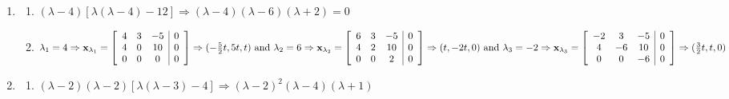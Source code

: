 \documentclass[12pt]{article}
\begin{document}
\begin{enumerate}
\begin{enumerate}
    \end{enumerate}

    \setcounter{enumi}{24}

  \item

    \begin{enumerate}

      \item $(\lambda-4)\left[ \lambda(\lambda-4)-12 \right]\Rightarrow (\lambda-4)(\lambda-6)(\lambda+2)=0$

      \item $\lambda_1=4\Rightarrow \bold{x}_{\lambda_1}=\left[ \begin{array}{ccc|c} 4 & 3 & -5 & 0\\ 4 & 0 & 10 & 0\\ 0 & 0 & 0 & 0   \end{array} \right]\Rightarrow (-\frac{5}{2}t,5t,t)\text{ and }\lambda_2=6\Rightarrow \bold{x}_{\lambda_2}=\left[ \begin{array}{ccc|c} 6 & 3 & -5 & 0\\ 4 & 2 & 10 & 0\\ 0 & 0 & 2 & 0 \end{array} \right]\Rightarrow (t,-2t,0)\text{ and }\lambda_3=-2\Rightarrow \bold{x}_{\lambda_3}=\left[ \begin{array}{ccc|c} -2 & 3 & -5 & 0\\ 4 & -6 & 10 & 0\\ 0 & 0 & -6 & 0   \end{array} \right]\Rightarrow (\frac{3}{2}t,t,0)$

    \end{enumerate}

    \setcounter{enumi}{26}

  \item

    \begin{enumerate}

      \item $(\lambda-2)(\lambda-2)\left[ \lambda(\lambda-3)-4 \right]\Rightarrow (\lambda-2)^2(\lambda-4)(\lambda+1)$


\end{enumerate}
\end{enumerate}
\end{document}

